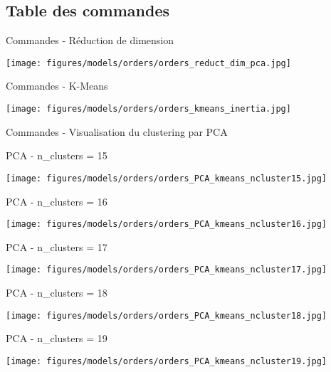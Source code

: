 \documentclass[10pt]{beamer}
\begin{document}
\subsection{Table des commandes}
\begin{frame}{Commandes - Réduction de dimension}
    \begin{center}             
       \texttt{[image: figures/models/orders/orders\_reduct\_dim\_pca.jpg]}
    \end{center}
\end{frame}
\begin{frame}{Commandes - K-Means}
    \begin{center}             
       \texttt{[image: figures/models/orders/orders\_kmeans\_inertia.jpg]}
    \end{center}
\end{frame}
\begin{frame}{Commandes - Visualisation du clustering par PCA}
    \begin{overprint}
            PCA - n\_clusters = 15
            \begin{center}             
                \texttt{[image: figures/models/orders/orders\_PCA\_kmeans\_ncluster15.jpg]}
            \end{center}
            PCA - n\_clusters = 16
            \begin{center}             
                \texttt{[image: figures/models/orders/orders\_PCA\_kmeans\_ncluster16.jpg]}
            \end{center}
            PCA - n\_clusters = 17
            \begin{center}             
                \texttt{[image: figures/models/orders/orders\_PCA\_kmeans\_ncluster17.jpg]}
            \end{center}
            PCA - n\_clusters = 18
            \begin{center}             
                \texttt{[image: figures/models/orders/orders\_PCA\_kmeans\_ncluster18.jpg]}
            \end{center}
            PCA - n\_clusters = 19
            \begin{center}             
                \texttt{[image: figures/models/orders/orders\_PCA\_kmeans\_ncluster19.jpg]}
            \end{center}
    \end{overprint}
\end{frame}
\end{document}
